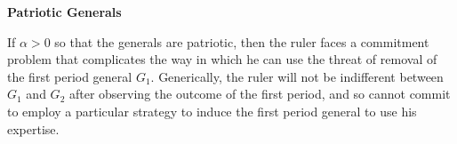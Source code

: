 \documentclass[11pt,]{article}
\begin{document}
\begin{center}
\textbf{\Large{Patriotic Generals}}\normalsize\\
\end{center}If $\alpha>0$ so that the generals are patriotic, then the ruler faces a commitment problem that complicates the way in which he can use the threat of removal of the first period general $G_1$.  Generically, the ruler will not be indifferent between $G_1$ and $G_2$ after observing the outcome of the first period, and so cannot commit to employ a particular strategy to induce the first period general to use his expertise.  %
\end{document}
